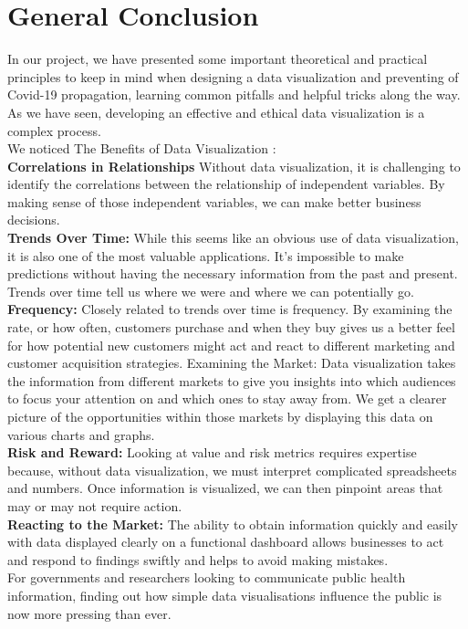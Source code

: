 \chapter*{General Conclusion}
In our project, we have presented some important theoretical and practical principles to keep in mind when designing a data visualization and preventing of Covid-19 propagation, learning common pitfalls and helpful tricks along the way. As we have seen, developing an effective and ethical data visualization is a complex process. \\

We noticed The Benefits of Data Visualization :\\
\textbf{Correlations in Relationships} Without data visualization, it is challenging to identify the correlations between the relationship of independent variables. By making sense of those independent variables, we can make better business decisions. \\

\textbf{Trends Over Time:} While this seems like an obvious use of data visualization, it is also one of the most valuable applications. It’s impossible to make predictions without having the necessary information from the past and present. Trends over time tell us where we were and where we can potentially go.\\

\textbf{Frequency:} Closely related to trends over time is frequency. By examining the rate, or how often, customers purchase and when they buy gives us a better feel for how potential new customers might act and react to different marketing and customer acquisition strategies. 
Examining the Market: Data visualization takes the information from different markets to give you insights into which audiences to focus your attention on and which ones to stay away from. We get a clearer picture of the opportunities within those markets by displaying this data on various charts and graphs.\\

\textbf{Risk and Reward: }Looking at value and risk metrics requires expertise because, without data visualization, we must interpret complicated spreadsheets and numbers. Once information is visualized, we can then pinpoint areas that may or may not require action.\\

\textbf{Reacting to the Market:} The ability to obtain information quickly and easily with data displayed clearly on a functional dashboard allows businesses to act and respond to findings swiftly and helps to avoid making mistakes.\\

For governments and researchers looking to communicate public health information, finding out how simple data visualisations influence the public is now more pressing than ever.
